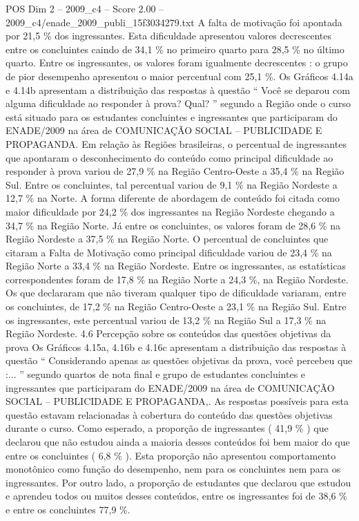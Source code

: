 \begin{textsample}{POS Dim 2 – 2009\_c4 – Score 2.00 – 2009\_c4/enade\_2009\_publi\_15f3034279.txt}
A falta de motivação foi apontada por 21,5 \% dos ingressantes.
Esta dificuldade apresentou valores decrescentes entre os concluintes caindo de 34,1 \% no primeiro quarto para 28,5 \% no último quarto.
Entre os ingressantes, os valores foram igualmente decrescentes : o grupo de pior desempenho apresentou o maior percentual com 25,1 \%.
Os Gráficos 4.14a e 4.14b apresentam a distribuição das respostas à questão “ Você se deparou com alguma dificuldade ao responder à prova?
Qual? ” segundo a Região onde o curso está situado para os estudantes concluintes e ingressantes que participaram do ENADE/2009 na área de COMUNICAÇÃO SOCIAL – PUBLICIDADE E PROPAGANDA.
Em relação às Regiões brasileiras, o percentual de ingressantes que apontaram o desconhecimento do conteúdo como principal dificuldade ao responder à prova variou de 27,9 \% na Região Centro-Oeste a 35,4 \% na Região Sul.
Entre os concluintes, tal percentual variou de 9,1 \% na Região Nordeste a 12,7 \% na Norte.
A forma diferente de abordagem de conteúdo foi citada como maior dificuldade por 24,2 \% dos ingressantes na Região Nordeste chegando a 34,7 \% na Região Norte.
Já entre os concluintes, os valores foram de 28,6 \% na Região Nordeste a 37,5 \% na Região Norte.
O percentual de concluintes que citaram a Falta de Motivação como principal dificuldade variou de 23,4 \% na Região Norte a 33,4 \% na Região Nordeste.
Entre os ingressantes, as estatísticas correspondentes foram de 17,8 \% na Região Norte a 24,3 \%, na Região Nordeste.
Os que declararam que não tiveram qualquer tipo de dificuldade variaram, entre os concluintes, de 17,2 \% na Região Centro-Oeste a 23,1 \% na Região Sul.
Entre os ingressantes, este percentual variou de 13,2 \% na Região Sul a 17,3 \% na Região Nordeste. 4.6 Percepção sobre os conteúdos das questões objetivas da prova Os Gráficos 4.15a, 4.16b e 4.16c apresentam a distribuição das respostas à questão “ Considerando apenas as questões objetivas da prova, você percebeu que :... ” segundo quartos de nota final e grupo de estudantes concluintes e ingressantes que participaram do ENADE/2009 na área de COMUNICAÇÃO SOCIAL – PUBLICIDADE E PROPAGANDA,.
As respostas possíveis para esta questão estavam relacionadas à cobertura do conteúdo das questões objetivas durante o curso.
Como esperado, a proporção de ingressantes ( 41,9 \% ) que declarou que não estudou ainda a maioria desses conteúdos foi bem maior do que entre os concluintes ( 6,8 \% ).
Esta proporção não apresentou comportamento monotônico como função do desempenho, nem para os concluintes nem para os ingressantes.
Por outro lado, a proporção de estudantes que declarou que estudou e aprendeu todos ou muitos desses conteúdos, entre os ingressantes foi de 38,6 \% e entre os concluintes 77,9 \%.

\end{textsample}
